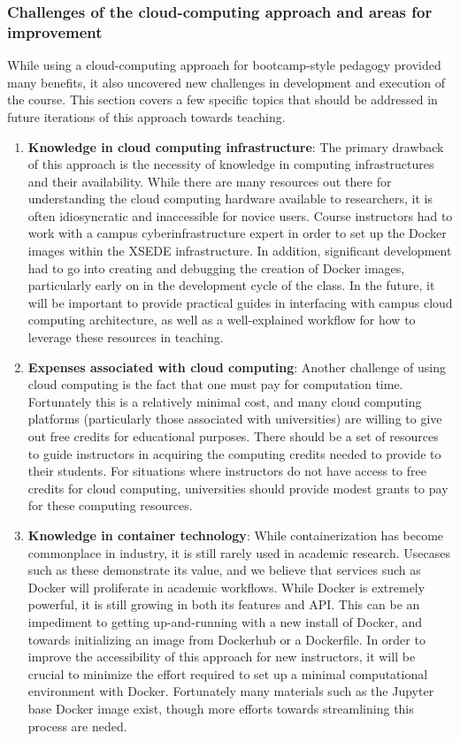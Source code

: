 \subsubsection{Challenges of the cloud-computing approach and areas for improvement}

While using a cloud-computing approach for bootcamp-style pedagogy provided many
benefits, it also uncovered new challenges in development and execution of the
course. This section covers a few specific topics that should be addressed in
future iterations of this approach towards teaching.

\begin{enumerate}

\item {\bf Knowledge in cloud computing infrastructure}: The primary drawback of this approach is the necessity of knowledge in computing infrastructures and their availability. While there are many resources out there for understanding the cloud computing hardware available to researchers, it is often idiosyncratic and inaccessible for novice users. Course instructors had to work with a campus cyberinfrastructure expert in order to set up the Docker images within the XSEDE infrastructure. In addition, significant development had to go into creating and debugging the creation of Docker images, particularly early on in the development cycle of the class. In the future, it will be important to provide practical guides in interfacing with campus cloud computing architecture, as well as a well-explained workflow for how to leverage these resources in teaching.

\item {\bf Expenses associated with cloud computing}: Another challenge of using
cloud computing is the fact that one must pay for computation time. Fortunately
this is a relatively minimal cost, and many cloud computing platforms
(particularly those associated with universities) are willing to give out free
credits for educational purposes. There should be a set of resources to guide
instructors in acquiring the computing credits needed to provide to their
students. For situations where instructors do not have access to free credits
for cloud computing, universities should provide modest grants to pay for these
computing resources.

\item {\bf Knowledge in container technology}: While containerization has become
commonplace in industry, it is still rarely used in academic research. Usecases
such as these demonstrate its value, and we believe that services such as Docker
will proliferate in academic workflows. While Docker is extremely powerful, it
is still growing in both its features and API. This can be an impediment to
getting up-and-running with a new install of Docker, and towards initializing an
image from Dockerhub or a Dockerfile. In order to improve the accessibility of
this approach for new instructors, it will be crucial to minimize the effort
required to set up a minimal computational environment with Docker. Fortunately
many materials such as the Jupyter base Docker image exist, though more efforts
towards streamlining this process are neded.


\end{enumerate}
